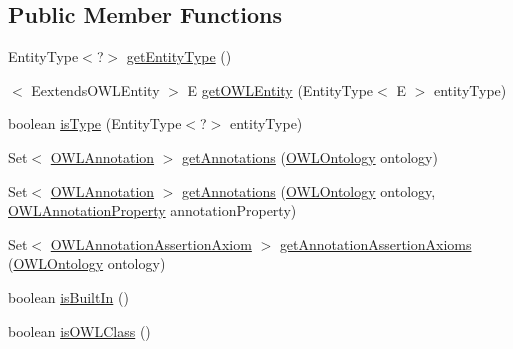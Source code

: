 \subsection*{Public Member Functions}
\begin{DoxyCompactItemize}
\item 
Entity\-Type$<$?$>$ \hyperlink{interfaceorg_1_1semanticweb_1_1owlapi_1_1model_1_1_o_w_l_entity_a1e6edcdea138c63f94bd7144116c307e}{get\-Entity\-Type} ()
\item 
$<$ Eextends\-O\-W\-L\-Entity $>$ E \hyperlink{interfaceorg_1_1semanticweb_1_1owlapi_1_1model_1_1_o_w_l_entity_a0e10754136af0b1494f87481ca3f1bf6}{get\-O\-W\-L\-Entity} (Entity\-Type$<$ E $>$ entity\-Type)
\item 
boolean \hyperlink{interfaceorg_1_1semanticweb_1_1owlapi_1_1model_1_1_o_w_l_entity_a0c6fe23da50ceeb6c2172d8c1e9df560}{is\-Type} (Entity\-Type$<$?$>$ entity\-Type)
\item 
Set$<$ \hyperlink{interfaceorg_1_1semanticweb_1_1owlapi_1_1model_1_1_o_w_l_annotation}{O\-W\-L\-Annotation} $>$ \hyperlink{interfaceorg_1_1semanticweb_1_1owlapi_1_1model_1_1_o_w_l_entity_ada7972bf6df6193ff3efdfe2fbf3d53d}{get\-Annotations} (\hyperlink{interfaceorg_1_1semanticweb_1_1owlapi_1_1model_1_1_o_w_l_ontology}{O\-W\-L\-Ontology} ontology)
\item 
Set$<$ \hyperlink{interfaceorg_1_1semanticweb_1_1owlapi_1_1model_1_1_o_w_l_annotation}{O\-W\-L\-Annotation} $>$ \hyperlink{interfaceorg_1_1semanticweb_1_1owlapi_1_1model_1_1_o_w_l_entity_a7fe38293f4900076bea5cddceb656d6e}{get\-Annotations} (\hyperlink{interfaceorg_1_1semanticweb_1_1owlapi_1_1model_1_1_o_w_l_ontology}{O\-W\-L\-Ontology} ontology, \hyperlink{interfaceorg_1_1semanticweb_1_1owlapi_1_1model_1_1_o_w_l_annotation_property}{O\-W\-L\-Annotation\-Property} annotation\-Property)
\item 
Set$<$ \hyperlink{interfaceorg_1_1semanticweb_1_1owlapi_1_1model_1_1_o_w_l_annotation_assertion_axiom}{O\-W\-L\-Annotation\-Assertion\-Axiom} $>$ \hyperlink{interfaceorg_1_1semanticweb_1_1owlapi_1_1model_1_1_o_w_l_entity_a0f015b2f5c05711311a54533179a4e71}{get\-Annotation\-Assertion\-Axioms} (\hyperlink{interfaceorg_1_1semanticweb_1_1owlapi_1_1model_1_1_o_w_l_ontology}{O\-W\-L\-Ontology} ontology)
\item 
boolean \hyperlink{interfaceorg_1_1semanticweb_1_1owlapi_1_1model_1_1_o_w_l_entity_a830bbc06f2d4eaacd03b10504e79bf19}{is\-Built\-In} ()
\item 
boolean \hyperlink{interfaceorg_1_1semanticweb_1_1owlapi_1_1model_1_1_o_w_l_entity_a121f0753243bca7c4b9b6ed388570c58}{is\-O\-W\-L\-Class} ()

\end{DoxyCompactItemize}
